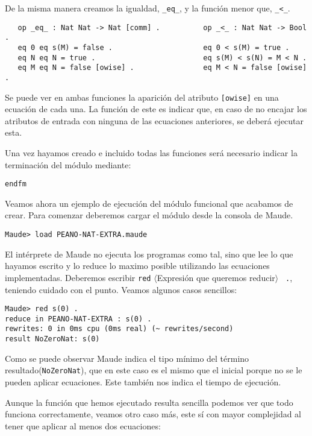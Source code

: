 De la misma manera creamos la igualdad, \verb"_eq_", y la función menor que, \verb"_<_".\par

{\codesize
\begin{verbatim}
   op _eq_ : Nat Nat -> Nat [comm] .          op _<_ : Nat Nat -> Bool .
   eq 0 eq s(M) = false .                     eq 0 < s(M) = true .
   eq N eq N = true .                         eq s(M) < s(N) = M < N .
   eq M eq N = false [owise] .                eq M < N = false [owise] .
\end{verbatim}
}
Se puede ver en ambas funciones la aparición del atributo \verb"[owise]" en una ecuación de cada una. La función de este es indicar que, en caso de no encajar los atributos de entrada con ninguna de las ecuaciones anteriores, se deberá ejecutar esta. \par

Una vez hayamos creado e incluido todas las funciones será necesario indicar la terminación del módulo mediante: \par

{\codesize
\begin{verbatim}
endfm
\end{verbatim}
}

Veamos ahora un ejemplo de ejecución del módulo funcional que acabamos de crear. Para comenzar deberemos cargar el módulo desde la consola de Maude.\par

{\codesize
\begin{verbatim}
Maude> load PEANO-NAT-EXTRA.maude
\end{verbatim}
}

El intérprete de Maude no ejecuta los programas como tal, sino que lee lo que hayamos escrito y lo reduce lo maximo posible utilizando las ecuaciones implementadas. Deberemos escribir \texttt{red} $\langle$Expresión que queremos reducir$\rangle$ \verb" .", teniendo cuidado con el punto. Veamos algunos casos sencillos:
{\codesize
\begin{verbatim}
Maude> red s(0) .
reduce in PEANO-NAT-EXTRA : s(0) .
rewrites: 0 in 0ms cpu (0ms real) (~ rewrites/second)
result NoZeroNat: s(0)
\end{verbatim}
}
\noindent Como se puede observar Maude indica el tipo mínimo del término resultado(\texttt{NoZeroNat}), que en este caso es el mismo que el inicial porque no se le pueden aplicar ecuaciones. Este también nos indica el tiempo de ejecución.

Aunque la función que hemos ejecutado resulta sencilla podemos ver que todo funciona correctamente, veamos otro caso más, este sí con mayor complejidad al tener que aplicar al menos dos ecuaciones:\par

